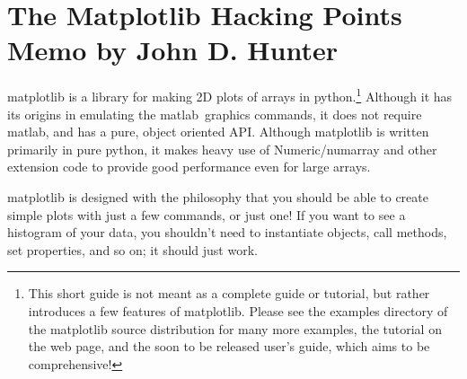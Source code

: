 \documentclass[twoside,10pt]{book}
\begin{document}


\newcommand{\fig}[4]
{\begin{figure}[ht]
\begin{center}
\texttt{[image: \#2]}
\caption{\label{#4} #3}
\end{center}
\end{figure}}

\newcommand{\mytextsize}[0]{\footnotesize}
\newcommand{\myheadersize}[0]{\small}
\newcommand{\matlab}[0]{matlab{\texttrademark}}
\newcommand{\fname}[1]{{\tt #1}}
\newcommand{\func}[1]{{\tt #1}}
\newcommand{\code}[1]{{\tt #1}}
\newcommand{\prompt}[1]{\code{>>> #1}}
\newcommand{\carg}[1]{\textit{#1}} %
\newcommand{\val}[1]{\textit{#1}}
\newcommand{\rc}[1]{{\tt #1}}

\newcommand{\mpldoc}[1]{#1}

\mytextsize
\section*{\Large The Matplotlib Hacking Points Memo \large by John D. Hunter}

matplotlib is a library for making 2D plots of arrays in
python.\footnote{This short guide is not meant as a complete guide or
  tutorial, but rather introduces a few features of matplotlib.
  Please see the examples directory of the matplotlib source
  distribution for many more examples, the tutorial on the web page,
  and the soon to be released user's guide, which aims to be
  comprehensive!  } Although it has its origins in emulating the
\matlab\ graphics commands, it does not require matlab, and has a
pure, object oriented API.  Although matplotlib is written primarily
in pure python, it makes heavy use of Numeric/numarray and other
extension code to provide good performance even for large arrays.

matplotlib is designed with the philosophy that you should be able to
create simple plots with just a few commands, or just one!  If you
want to see a histogram of your data, you shouldn't need to
instantiate objects, call methods, set properties, and so on; it
should just work.
\end{document}
